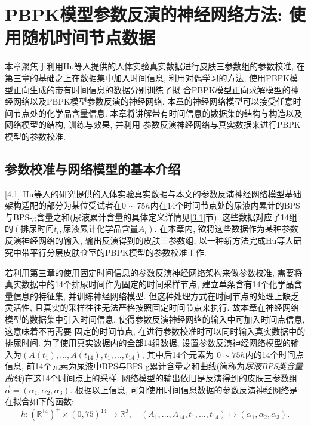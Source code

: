 \documentclass[a4paper,punct=banjiao,twoside]{ctexrep}
\theoremstyle{plain}
\theoremstyle{definition}
\theoremstyle{remark}
\begin{document}
\chapter{PBPK模型参数反演的神经网络方法: 使用随机时间节点数据}

本章聚焦于利用Hu等人\cite{11}提供的人体实验真实数据进行皮肤三参数组的参数校准, 在第三章的基础之上在数据集中加入时间信息, 利用对偶学习的方法, 使用PBPK模型正向生成的带有时间信息的数据分别训练了拟
合PBPK模型正向求解模型的神经网络以及PBPK模型参数反演的神经网络. 本章的神经网络模型可以接受任意时间节点处的化学品含量信息. 本章将讲解带有时间信息的数据集的结构与构造以及网络模型的结构, 训练与效果, 并利用
参数反演神经网络与真实数据来进行PBPK模型的参数校准.

\section{参数校准与网络模型的基本介绍}
\ref{4.1}
Hu等人\cite{11}的研究提供的人体实验真实数据与本文的参数反演神经网络模型基础架构适配的部分为某位受试者在$0\sim 75h$内在$14$个时间节点处的尿液内累计的BPS与BPS-g含量之和(尿液累计含量的具体定义详情见\ref{3.1}节).
这些数据对应了14组的$(\textit{排尿时间}t_i, \textit{尿液累计化学品含量}A_i)$. 
在本章内, 欲将这些数据作为某种参数反演神经网络的输入, 输出反演得到的皮肤三参数组, 以一种新方法完成Hu等人\cite{11}研究中带平行分层皮肤仓室的PBPK模型的参数校准工作.

若利用第三章的使用固定时间信息的参数反演神经网络架构来做参数校准, 需要将真实数据中的14个排尿时间作为固定的时间采样节点, 建立单条含有14个化学品含量信息的特征集, 并训练神经网络模型. 
但这种处理方式在时间节点的处理上缺乏灵活性, 且真实的采样往往无法严格按照固定时间节点来执行. 故本章在神经网络模型的数据集中引入时间信息, 使得参数反演神经网络的输入中可加入时间点信息, 这意味着不再需要
固定的时间节点, 在进行参数校准时可以同时输入真实数据中的排尿时间. 为了使用真实数据内的全部14组数据, 设置参数反演神经网络模型的输入为$(A(t_1),\dots,A(t_{14}),t_1,\dots,t_{14})$, 其中后14个元素为
$0\sim 75h$内的14个时间点信息, 前14个元素为尿液中BPS与BPS-g累计含量之和曲线(简称为\textit{尿液BPS类含量曲线})在这14个时间点上的采样. 网络模型的输出依旧是反演得到的皮肤三参数组
$\vec{\alpha} = (\alpha_1,\alpha_2,\alpha_3)$. 
根据以上信息, 可知使用时间信息数据的参数反演神经网络是在拟合如下的函数:
\begin{equation}
  \label{eq3.2}
  h:(\mathbb{R}^{14})^{+}\times (0,75)^{14} \to \mathbb{R}^{3},\quad (A_1,\dots,A_{14},t_1,\dots,t_{14})\mapsto (\alpha_1,\alpha_2,\alpha_3).
\end{equation}
\end{document}
